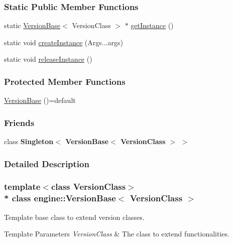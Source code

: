 \subsubsection*{Static Public Member Functions}
\begin{DoxyCompactItemize}
\item 
static \hyperlink{a00079}{Version\+Base}$<$ Version\+Class $>$ $\ast$ \hyperlink{a00069_a90ed1f21b1811a569eafccc78fcd12ca}{get\+Instance} ()
\item 
static void \hyperlink{a00069_a571e434c8ff771bf65de40f8a7b22076}{create\+Instance} (Args...\+args)
\item 
static void \hyperlink{a00069_a3fbed1f6a78cdf1d0c11467a3be61841}{release\+Instance} ()
\end{DoxyCompactItemize}
\subsubsection*{Protected Member Functions}
\begin{DoxyCompactItemize}
\item 
\hyperlink{a00079_a706934249d82028c323d45749a13d884}{Version\+Base} ()=default
\end{DoxyCompactItemize}
\subsubsection*{Friends}
\begin{DoxyCompactItemize}
\item 
class {\bfseries Singleton$<$ Version\+Base$<$ Version\+Class $>$ $>$}\hypertarget{a00079_a1c46032cef993c3af14bd8a1ddf00716}{}\label{a00079_a1c46032cef993c3af14bd8a1ddf00716}

\end{DoxyCompactItemize}


\subsubsection{Detailed Description}
\subsubsection*{template$<$class Version\+Class$>$\\*
class engine\+::\+Version\+Base$<$ Version\+Class $>$}

Template base class to extend version classes. 
\begin{DoxyTemplParams}{Template Parameters}
{\em Version\+Class} & The class to extend functionalities. \\
\hline
\end{DoxyTemplParams}


